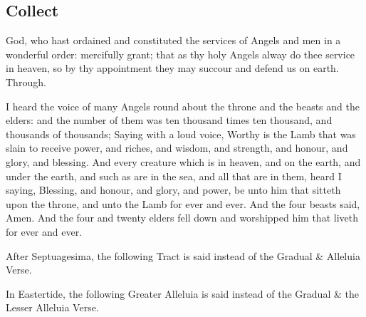 \subsection{Collect}
 God, who hast ordained and constituted the services of Angels and men in a wonderful order: mercifully grant; that as thy holy Angels alway do thee service in heaven, so by thy appointment they may succour and defend us on earth. Through.

 I heard the voice of many Angels round about the throne and the beasts and the elders: and the number of them was ten thousand times ten thousand, and thousands of thousands; Saying with a loud voice, Worthy is the Lamb that was slain to receive power, and riches, and wisdom, and strength, and honour, and glory, and blessing. And every creature which is in heaven, and on the earth, and under the earth, and such as are in the sea, and all that are in them, heard I saying, Blessing, and honour, and glory, and power, be unto him that sitteth upon the throne, and unto the Lamb for ever and ever. And the four beasts said, Amen. And the four and twenty elders fell down and worshipped him that liveth for ever and ever.


\clearpage
\begin{rubric}
    After Septuagesima, the following Tract is said instead of the Gradual \& Alleluia Verse.
\end{rubric}


\begin{rubric}
    In Eastertide, the following Greater Alleluia is said instead of the Gradual \& the Lesser Alleluia Verse.
\end{rubric}



